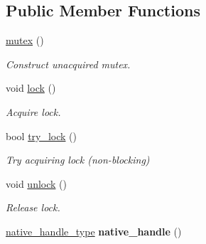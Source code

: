 \subsection*{Public Member Functions}
\begin{DoxyCompactItemize}
\item 
\hypertarget{classtbb_1_1mutex_ad1b280c954ffc8b8b3e63e4ee4144035}{}\hyperlink{classtbb_1_1mutex_ad1b280c954ffc8b8b3e63e4ee4144035}{mutex} ()\label{classtbb_1_1mutex_ad1b280c954ffc8b8b3e63e4ee4144035}

\begin{DoxyCompactList}\small\item\em Construct unacquired mutex. \end{DoxyCompactList}\item 
\hypertarget{classtbb_1_1mutex_a95ff02ee699b34696001db4003c11a3a}{}void \hyperlink{classtbb_1_1mutex_a95ff02ee699b34696001db4003c11a3a}{lock} ()\label{classtbb_1_1mutex_a95ff02ee699b34696001db4003c11a3a}

\begin{DoxyCompactList}\small\item\em Acquire lock. \end{DoxyCompactList}\item 
bool \hyperlink{classtbb_1_1mutex_a480283933106941125717499f9c5ad42}{try\+\_\+lock} ()
\begin{DoxyCompactList}\small\item\em Try acquiring lock (non-\/blocking) \end{DoxyCompactList}\item 
\hypertarget{classtbb_1_1mutex_a721eeae7ba16f8b92535f4534b583874}{}void \hyperlink{classtbb_1_1mutex_a721eeae7ba16f8b92535f4534b583874}{unlock} ()\label{classtbb_1_1mutex_a721eeae7ba16f8b92535f4534b583874}

\begin{DoxyCompactList}\small\item\em Release lock. \end{DoxyCompactList}\item 
\hypertarget{classtbb_1_1mutex_af69874d93822c905bdea0ab9e5ca5b89}{}\hyperlink{classtbb_1_1mutex_a0d992511dfc6f47295b10eb7fc0813d4}{native\+\_\+handle\+\_\+type} {\bfseries native\+\_\+handle} ()\label{classtbb_1_1mutex_af69874d93822c905bdea0ab9e5ca5b89}

\end{DoxyCompactItemize}
